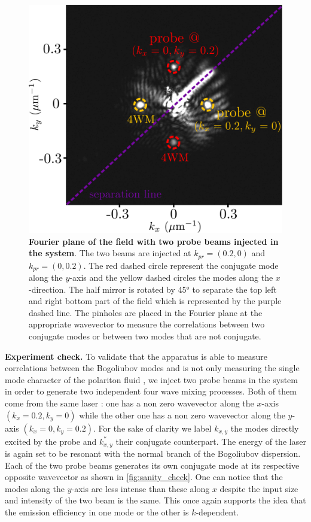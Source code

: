 \begin{figure}
    \centering
    \includegraphics[width=1\textwidth]{chap_correlation/fig/mosaic_4wm.pdf}
    \caption{\textbf{Fourier plane of the field with two probe beams injected in the system}. The two beams are injected at $k_{pr}=(0.2,0)$ and $k_{pr}=(0,0.2)$. The red dashed circle represent the conjugate mode along the $y$-axis and the yellow dashed circles the modes along the $x$-direction. The half mirror is rotated by 45° to separate the top left and right bottom part of the field
    which is represented by the purple dashed line. The pinholes are placed in the Fourier plane at the appropriate wavevector to measure the correlations between two conjugate modes or between two modes that are not conjugate.}
    \label{fig:sanity_check}
\end{figure}

\bigskip

\indent \textbf{Experiment check.} To validate that the apparatus is able to measure correlations between the Bogoliubov modes and is not only measuring the single mode character of the polariton fluid \cite{a_baas_quantum_degeneracy2006}, we inject two probe beams in the system in order to generate two independent 
four wave mixing processes. Both of them come from the same laser : one has a non zero wavevector along the $x$-axis $(k_x=0.2, k_y=0)$ while the other one has a non zero wavevector along the $y$-axis $(k_x=0, k_y=0.2)$. For the sake of clarity we label $k_{x,y}$ the modes directly excited by the probe and $k_{x,y}^*$ their conjugate counterpart. The energy of the laser is again set to be resonant with the normal branch of the Bogoliubov dispersion.
Each of the two probe beams generates its own conjugate mode at its respective opposite wavevector as shown in \autoref{fig:sanity_check}. 
One can notice that the modes along the $y$-axis are less intense than these along $x$ despite the input size and intensity of the two beam is the same. This once again supports the idea that the emission efficiency in one mode or the other is $k$-dependent. 

